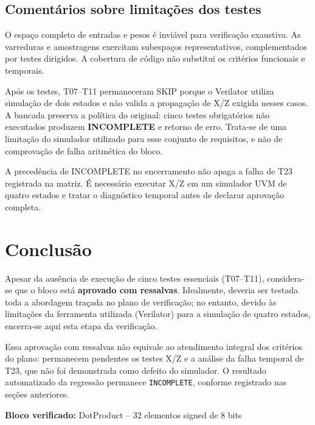 \documentclass[12pt,a4paper]{article}
\begin{document}
\subsection{Comentários sobre limitações dos testes}
O espaço completo de entradas e pesos é inviável para verificação exaustiva. As varreduras e amostragens exercitam subespaços representativos, complementados por testes dirigidos. A cobertura de código não substitui os critérios funcionais e temporais.

Após os testes, T07--T11 permaneceram SKIP porque o Verilator utiliza simulação de dois estados e não valida a propagação de X/Z exigida nesses casos. A bancada preserva a política do original: cinco testes obrigatórios não executados produzem \textbf{INCOMPLETE} e retorno de erro. Trata-se de uma limitação do simulador utilizado para esse conjunto de requisitos, e não de comprovação de falha aritmética do bloco.

A precedência de INCOMPLETE no encerramento não apaga a falha de T23 registrada na matriz. É necessário executar X/Z em um simulador UVM de quatro estados e tratar o diagnóstico temporal antes de declarar aprovação completa.


\section{Conclusão}
Apesar da ausência de execução de cinco testes essenciais (T07--T11), considera-se que o bloco está \textbf{aprovado com ressalvas}. Idealmente, deveria ser testada toda a abordagem traçada no plano de verificação; no entanto, devido às limitações da ferramenta utilizada (Verilator) para a simulação de quatro estados, encerra-se aqui esta etapa da verificação.

Essa aprovação com ressalvas não equivale ao atendimento integral dos critérios do plano: permanecem pendentes os testes X/Z e a análise da falha temporal de T23, que não foi demonstrada como defeito do simulador. O resultado automatizado da regressão permanece \texttt{INCOMPLETE}, conforme registrado nas seções anteriores.

\vfill
\begin{center}\textbf{Bloco verificado:} DotProduct -- 32 elementos signed de 8 bits\end{center}
\end{document}
